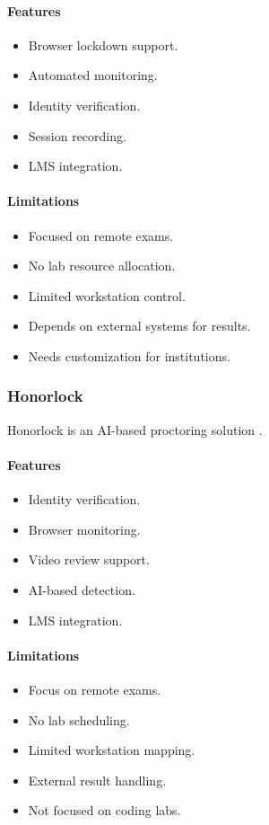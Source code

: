 \paragraph{Features}
\begin{itemize}[noitemsep]
\item Browser lockdown support.
\item Automated monitoring.
\item Identity verification.
\item Session recording.
\item LMS integration.
\end{itemize}

\paragraph{Limitations}
\begin{itemize}[noitemsep]
\item Focused on remote exams.
\item No lab resource allocation.
\item Limited workstation control.
\item Depends on external systems for results.
\item Needs customization for institutions.
\end{itemize}

\subsubsection{Honorlock}
Honorlock is an AI-based proctoring solution \cite{honorlock1}.

\paragraph{Features}
\begin{itemize}[noitemsep]
\item Identity verification.
\item Browser monitoring.
\item Video review support.
\item AI-based detection.
\item LMS integration.
\end{itemize}

\paragraph{Limitations}
\begin{itemize}[noitemsep]
\item Focus on remote exams.
\item No lab scheduling.
\item Limited workstation mapping.
\item External result handling.
\item Not focused on coding labs.
\end{itemize}

